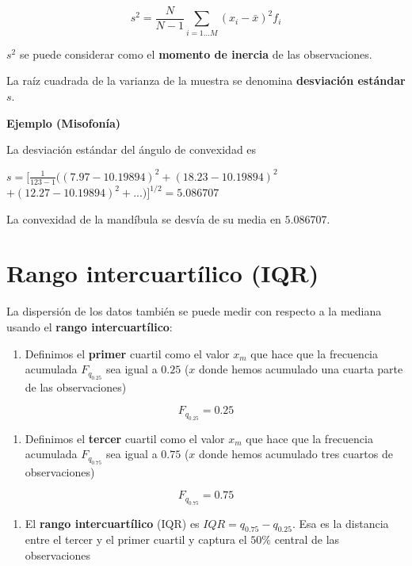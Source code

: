 \documentclass[
]{book}
\providecommand{\tightlist}{%
  \setlength{\itemsep}{0pt}\setlength{\parskip}{0pt}}
\begin{document}
\[s^2=\frac{N}{N-1} \sum_{i=1... M} (x_i-\bar{x})^2 f_i\]

\(s^2\) se puede considerar como el \textbf{momento de inercia} de las observaciones.

La raíz cuadrada de la varianza de la muestra se denomina \textbf{desviación estándar} \(s\).

\textbf{Ejemplo (Misofonía)}

La desviación estándar del ángulo de convexidad es

\(s= [\frac{1}{123-1}((7.97-10.19894)^2+ (18.23-10.19894)^2\)
\(+ (12.27-10.19894)^2 + ...)]^{1/2} = 5.086707\)

La convexidad de la mandíbula se desvía de su media en \(5.086707\).

\hypertarget{rango-intercuartuxedlico-iqr}{%
\section{Rango intercuartílico (IQR)}\label{rango-intercuartuxedlico-iqr}}

La dispersión de los datos también se puede medir con respecto a la mediana usando el \textbf{rango intercuartílico}:

\begin{enumerate}
\def\labelenumi{\arabic{enumi})}
\tightlist
\item
  Definimos el \textbf{primer} cuartil como el valor \(x_m\) que hace que la frecuencia acumulada \(F_{q_{0.25}}\) sea igual a \(0.25\) (\(x\) donde hemos acumulado una cuarta parte de las observaciones)
\end{enumerate}

\[F_{q_{0.25}}=0.25\]

\begin{enumerate}
\def\labelenumi{\arabic{enumi})}
\tightlist
\item
  Definimos el \textbf{tercer} cuartil como el valor \(x_m\) que hace que la frecuencia acumulada \(F_{q_{0.75}}\) sea igual a \(0.75\) (\(x\) donde hemos acumulado tres cuartos de observaciones)
\end{enumerate}

\[F_{q_{0.75}}=0.75\]

\begin{enumerate}
\def\labelenumi{\arabic{enumi})}
\setcounter{enumi}{2}
\tightlist
\item
  El \textbf{rango intercuartílico} (IQR) es \(IQR=q_{0.75} - q_{0.25}\). Esa es la distancia entre el tercer y el primer cuartil y captura el \(50\%\) central de las observaciones
\end{enumerate}
\end{document}
